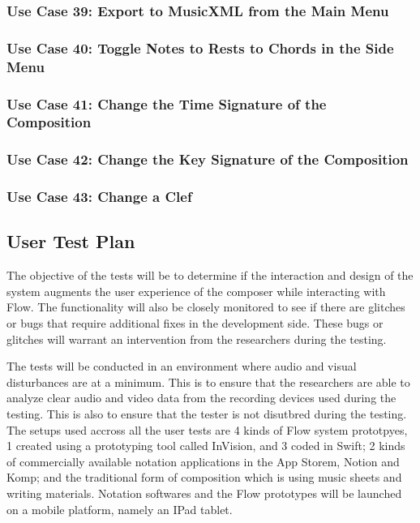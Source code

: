 \subsubsection{Use Case 39: Export to MusicXML from the Main Menu}


\subsubsection{Use Case 40: Toggle Notes to Rests to Chords in the Side Menu}


\subsubsection{Use Case 41: Change the Time Signature of the Composition}


\subsubsection{Use Case 42: Change the Key Signature of the Composition}


\subsubsection{Use Case 43: Change a Clef}


\subsection{User Test Plan}

The objective of the tests will be to determine if the interaction and design of the system augments the user experience of the composer while interacting with Flow. The functionality will also be closely monitored to see if there are glitches or bugs that require additional fixes in the development side. These bugs or glitches will warrant an intervention from the researchers during the testing.

The tests will be conducted in an environment where audio and visual disturbances are at a minimum. This is to ensure that the researchers are able to analyze clear audio and video data from the recording devices used during the testing. This is also to ensure that the tester is not disutbred during the testing. The setups used accross all the user tests are 4 kinds of Flow system prototpyes, 1 created using a prototyping tool called InVision, and 3 coded in Swift; 2 kinds of commercially available notation applications in the App Storem, Notion and Komp; and the traditional form of composition which is using music sheets and writing materials. Notation softwares and the Flow prototypes will be launched on a mobile platform, namely an IPad tablet.

